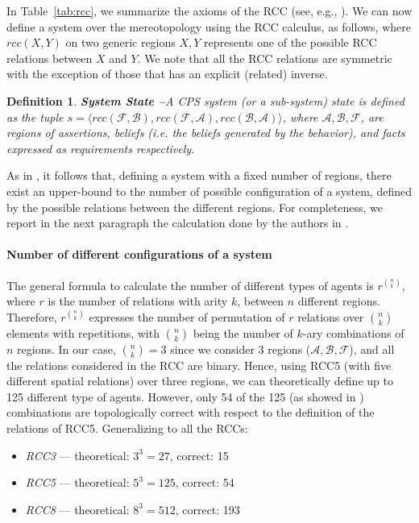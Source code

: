 \documentclass[conference]{IEEEtran}
\newcommand{\assertionRegion}{\mathcal{A}}
\newcommand{\beliefRegion}{\mathcal{B}}
\newcommand{\factRegion}{\mathcal{F}}
\newcommand{\rcc}{rcc}
\newtheorem{definition}{Definition}%
\begin{document}
In Table~\ref{tab:rcc}, we summarize the axioms of the RCC (see, e.g., \autocite{Grutter2008rcc}).  We can now define a system
over the mereotopology using the RCC calculus, as follows, where $\rcc(X,Y)$ on
two generic regions $X,Y$ represents one of the possible RCC relations between
$X$ and $Y$. We note that all the RCC relations are symmetric with the exception
of those that has an explicit (related) inverse.

\begin{definition}{\bf System State --}\label{def:opsystem}
	A CPS system (or a sub-system) state is defined as the tuple
	$s=\langle\rcc(\factRegion,\beliefRegion),\rcc(\factRegion,\assertionRegion),\rcc(\beliefRegion,\assertionRegion)\rangle$,
	where $\assertionRegion,\beliefRegion,\factRegion$, are regions of
	assertions, beliefs (i.e. the beliefs generated by the behavior), and
	facts expressed as requirements respectively.
\end{definition}

As in \autocite{Santaca2016abf}, it follows that, defining
a system with a fixed number of regions, there exist
an upper-bound to the number of possible configuration of a system, defined by
the possible relations between the different regions.
For completeness, we report in the next paragraph 
the calculation done by the authors in \autocite{Santaca2016abf}.

\paragraph{Number of different configurations of a system}
The general formula to calculate the number of different types of agents is
$r^{\binom{n}{k}}$, where $r$ is the number of relations with arity $k$,
between $n$ different regions. Therefore, $r^{\binom{n}{k}}$
expresses the number of permutation of $r$
relations over ${\binom{n}{k}}$ elements with repetitions, 
with ${\binom{n}{k}}$ being the number of
$k$-ary combinations of $n$ regions.
In our case, $\binom{n}{k}=3$ since we consider $3$ regions 
($\assertionRegion,\beliefRegion,\factRegion$), and all the relations
considered in the RCC are binary.  Hence, using RCC5 (with five different
spatial relations) over three regions, we can theoretically define up to 125
different type of agents. However, only 54 of the 125 (as showed in
\autocite{improvingRCC}) combinations are topologically correct with respect to
the definition of the relations of RCC5. Generalizing to all the RCCs:

\begin{itemize}%
\item \emph{RCC3} --- theoretical: $3^3=27$,  correct: 15 
\item \emph{RCC5} --- theoretical: $5^3=125$, correct: 54
\item \emph{RCC8} --- theoretical: $8^3=512$, correct: 193
\end{itemize}
\end{document}
